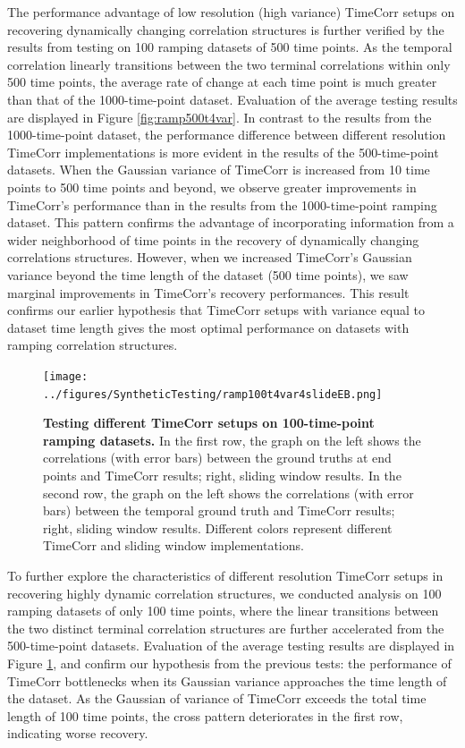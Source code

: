 \documentclass[11pt]{article}
\begin{document}
The performance advantage of low resolution (high variance) TimeCorr setups on recovering dynamically changing correlation structures is further verified by the results from testing on 100 ramping datasets of 500 time points. As the temporal correlation linearly transitions between the two terminal correlations within only 500 time points, the average rate of change at each time point is much greater than that of the 1000-time-point dataset. Evaluation of the average testing results are displayed in Figure \ref{fig:ramp500t4var}. In contrast to the results from the 1000-time-point dataset, the performance difference between different resolution TimeCorr implementations is more evident in the results of the 500-time-point datasets. When the Gaussian variance of TimeCorr is increased from 10 time points to 500 time points and beyond, we observe greater improvements in TimeCorr's performance than in the results from the 1000-time-point ramping dataset. This pattern confirms the advantage of incorporating information from a wider neighborhood of time points in the recovery of dynamically changing correlations structures. However, when we increased TimeCorr's Gaussian variance beyond the time length of the dataset (500 time points), we saw marginal improvements in TimeCorr's recovery performances. This result confirms our earlier hypothesis that TimeCorr setups with variance equal to dataset time length gives the most optimal performance on datasets with ramping correlation structures.


\begin{figure}[!htb]
\texttt{[image: ../figures/SyntheticTesting/ramp100t4var4slideEB.png]}
\caption{\textbf{Testing different TimeCorr setups on 100-time-point ramping datasets.} In the first row, the graph on the left shows the correlations (with error bars) between the ground truths at end points and TimeCorr results; right, sliding window results. In the second row, the graph on the left shows the correlations (with error bars) between the temporal ground truth and TimeCorr results; right, sliding window results. Different colors represent different TimeCorr and sliding window implementations.}
\label{fig:ramp100t4var}
\end{figure}

To further explore the characteristics of different resolution TimeCorr setups in recovering highly dynamic correlation structures, we conducted analysis on 100 ramping datasets of only 100 time points, where the linear transitions between the two distinct terminal correlation structures are further accelerated from the 500-time-point datasets. Evaluation of the average testing results are displayed in Figure \ref{fig:ramp100t4var}, and confirm our hypothesis from the previous tests: the performance of TimeCorr bottlenecks when its Gaussian variance approaches the time length of the dataset. As the Gaussian of variance of TimeCorr exceeds the total time length of 100 time points, the cross pattern deteriorates in the first row, indicating worse recovery.
\end{document}
